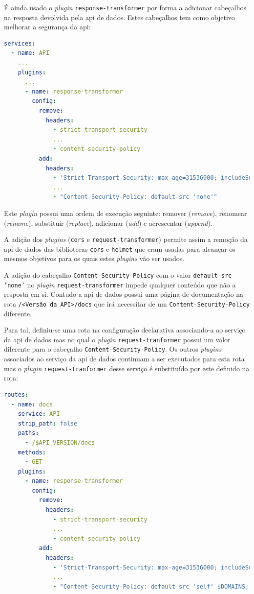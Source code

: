 É ainda usado o \textit{plugin} \texttt{response-transformer} por forma a adicionar cabeçalhos na resposta devolvida pela \acrshort{api} de dados. Estes cabeçalhos tem como objetivo melhorar a segurança da \acrshort{api}\cite{kongResponseTransformer}:
\begin{lstlisting}[language=yaml, caption=Configuração declarativa do \textit{Kong}: \textit{plugin} \texttt{response-transformer}]
services:
  - name: API
    ...
    plugins:
      ...
      - name: response-transformer
        config:
          remove:
            headers:
              - strict-transport-security
              ...
              - content-security-policy
          add:
            headers:
              - 'Strict-Transport-Security: max-age=31536000; includeSubDomains; preload'
              ...
              - "Content-Security-Policy: default-src 'none'"
\end{lstlisting}

Este \textit{plugin} possui uma ordem de execução seguinte: remover (\textit{remove}), renomear (\textit{rename}), substituir (\textit{replace}), adicionar (\textit{add}) e acrescentar (\textit{append}).

A adição dos \textit{plugins} (\texttt{cors} e \texttt{request-transformer}) permite assim a remoção da \acrshort{api} de dados das bibliotecas \texttt{cors} e \texttt{helmet} que eram usadas para alcançar os mesmos objetivos para os quais estes \textit{plugins} vão ser usados.

A adição do cabeçalho \texttt{Content-Security-Policy} com o valor \texttt{default-src 'none'} no \textit{plugin} \texttt{request-transformer} impede qualquer conteúdo que não a resposta em si. Contudo a \acrshort{api} de dados possui uma página de documentação na rota \texttt{/<Versão da API>/docs} que irá necessitar de um \texttt{Content-Security-Policy} diferente. 

Para tal, definiu-se uma rota na configuração declarativa associando-a ao serviço da \acrshort{api} de dados mas no qual o \textit{plugin} \texttt{request-tranformer} possui um valor diferente para o cabeçalho \texttt{Content-Security-Policy}. Os outros \textit{plugins} associados ao serviço da \acrshort{api} de dados continuam a ser executados para esta rota mas o \textit{plugin} \texttt{request-tranformer} desse serviço é substituído por este definido na rota:
\begin{lstlisting}[language=yaml, caption=Configuração declarativa do \textit{Kong}: Rota da documentação]
routes:
  - name: docs
    service: API
    strip_path: false
    paths:
      - /$API_VERSION/docs
    methods:
      - GET
    plugins:
      - name: response-transformer
        config:
          remove:
            headers:
              - strict-transport-security
              ...
              - content-security-policy
          add:
            headers:
              - 'Strict-Transport-Security: max-age=31536000; includeSubDomains; preload'
              ...
              - "Content-Security-Policy: default-src 'self' $DOMAINS; img-src 'self' https://validator.swagger.io data: $DOMAINS; style-src 'self' 'unsafe-inline' $DOMAINS; script-src 'self' 'unsafe-inline' $DOMAINS"
\end{lstlisting}

